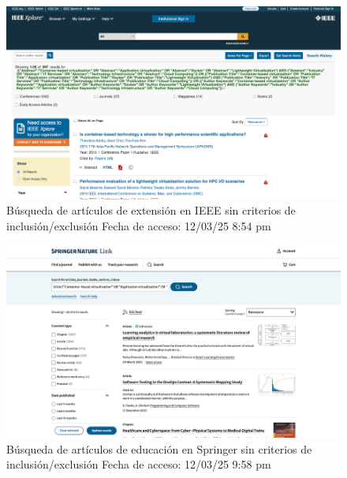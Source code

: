 \begin{figure}[htbp]
    \centering
    \includegraphics[width=\textwidth,keepaspectratio]{apendices/BD/sin-criterios/IEEE-ind.png}
    \caption{Búsqueda de artículos de extensión en IEEE sin criterios de inclusión/exclusión
    Fecha de acceso: 12/03/25 8:54 pm
    }\label{fig:busqueda6}
\end{figure}
\FloatBarrier

\begin{figure}[htbp]
    \centering
    \includegraphics[width=\textwidth,keepaspectratio]{apendices/BD/sin-criterios/Springer-ed.png}
    \caption{Búsqueda de artículos de educación en Springer sin criterios de inclusión/exclusión
    Fecha de acceso: 12/03/25 9:58 pm
    }\label{fig:busqueda7}
\end{figure}
\FloatBarrier

